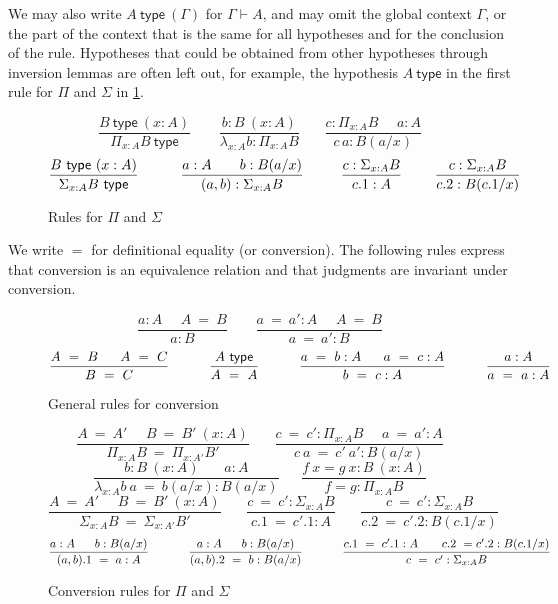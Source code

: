 \documentclass[11pt,a4paper]{article}
\theoremstyle{definition}
\newcommand{\conv}{=}
\newcommand{\type}{\mathsf{type}}
\newcommand{\mylam}[3]{\lambda_{#1:#2}#3}
\newcommand{\mypi}[3]{\Pi_{#1:#2}#3}
\newcommand{\mysig}[3]{\Sigma_{#1:#2}#3}
\newcommand{\app}[2]{{#1\,#2}} %
\begin{document}
We may also write $A~\type~(\Gamma)$ for $\Gamma\vdash A$,
and may omit the global context $\Gamma$,
or the part of the context that is the same for all hypotheses and for the
conclusion of the rule.
Hypotheses that could be obtained from other
hypotheses through inversion lemmas are often left out,
for example, the hypothesis $A~\type$ in the first rule for $\Pi$ and $\Sigma$
in \cref{fig:PiSig}.

\begin{figure}[h]
  \caption{Rules for $\Pi$ and $\Sigma$}\label{fig:PiSig}
$$
\frac{B~\type~(x:A)}{\mypi{x}{A}{B}~\type}~~~~~~~~~
\frac{b:B~(x:A)}{\mylam{x}{A}{b}:\mypi{x}{A}{B}}~~~~~~~~
\frac{c:\mypi{x}{A}{B}~~~~~~a:A}
     {\app{c}{a}:B(a/x)}
$$
$$
\frac{B~\type~(x:A)}{\mysig{x}{A}{B}~\type}~~~~~~~~~
\frac{a:A~~~~~~b:B(a/x)}{(a,b):\mysig{x}{A}{B}}~~~~~~~~
\frac{c:\mysig{x}{A}{B}}{c.1:A}~~~~~~~
\frac{c:\mysig{x}{A}{B}}{c.2:B(c.1/x)}
\belowdisplayshortskip -1pt
$$
\end{figure}


We write $\conv$ for definitional equality (or conversion).
The following rules express that conversion is an equivalence
relation and that judgments are invariant under conversion.

\begin{figure}[h]
  \caption{General rules for conversion}\label{fig:conversion}
$$
\frac{ a:A~~~~~~ A~ \conv~ B}{ a:B}~~~~~~~~~
\frac{ a ~\conv~a':A~~~~~~ A  ~\conv~ B}{ a ~\conv~a':B}
$$
$$
\frac{A~=~B~~~~~A~=~C}{B~=~C}~~~~~~~~~\frac{A~\type}{A~=~A}~~~~~~~~~
\frac{a~=~b:A~~~~~a~=~c:A}{b~=~c:A}~~~~~~~~~\frac{a:A}{a~=~a:A}
\belowdisplayshortskip 1pt
$$
\end{figure}

\begin{figure}[H]
  \caption{Conversion rules for $\Pi$ and $\Sigma$}\label{fig:convPiSig}
$$
\frac{A~=~A'~~~~~~B~=~B'~(x:A)}{\mypi{x}{A}{B}~=~\mypi{x}{A'}{B'}}~~~~~~~~
\frac{c~=~c':\mypi{x}{A}{B}~~~~~~a~=~a':A}{c~a~=~c'~a':B(a/x)}
$$
$$
\frac{b:B~(x:A)~~~~~~~~ a:A}{ \mylam{x}{A}{b}~a  ~\conv~ b(a/x):B(a/x)}
~~~~~~~
\frac{f~x = g~x:B~(x:A)}{ f = g : \mypi{x}{A}{B}}
$$
$$
\frac{A~=~A'~~~~~~B~=~B'~(x:A)}{\mysig{x}{A}{B}~=~\mysig{x}{A'}{B'}}~~~~~~~~
\frac{c~=~c':\mysig{x}{A}{B}}{c.1~=~c'.1:A}~~~~~~~~
\frac{c~=~c':\mysig{x}{A}{B}}{c.2~=~c'.2:B(c.1/x)}~~~~~~~~
$$
$$
\frac{a:A~~~~~b:B(a/x)}{ (a,b).1 ~\conv~ a:A}~~~~~~~~~~
\frac{a:A~~~~~b:B(a/x)}{ (a,b).2 ~\conv~ b:B(a/x)}~~~~~~~~~~
\frac{c.1~=~ c'.1:A~~~~~~c.2~=c'.2:B(c.1/x)}{ c~=~ c' : \mysig{x}{A}{B}}
\belowdisplayshortskip 0pt
$$
\end{figure}
\end{document}
